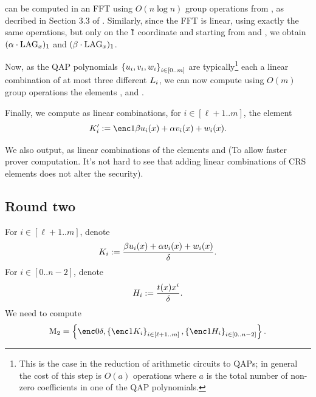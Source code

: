 \documentclass{article}
\begin{document}
 can be computed in an FFT using $O(n \log n)$ group operations from  \powersenc, as decribed in Section 3.3 of \cite{BGG17}.
Similarly, since the FFT is linear, using exactly the same operations, but only on the \G1 coordinate and starting from \powersencalpha and \powersencbeta,
we obtain $(\alpha \cdot \mathrm{LAG}_{x})_1$ and $(\beta\cdot \mathrm{LAG}_{x})_1$.

Now, as the QAP polynomials $\left\{u_i,v_i,w_i\right\}_{i\in [0..m]}$ are typically\footnote{This is the case in the reduction of arithmetic circuits to QAPs; in general the cost of this step is $O(a)$ operations where $a$ is the total number of non-zero coefficients in one of the QAP polynomials.} each a linear combination of at most three different $L_{i}$,
we can now compute using $O(m)$ group operations the elements
\Apolys, \Bpolys and \Cpolys.

Finally, we compute as linear combinations, for $i\in [\ell+1..m]$, the element
\[K'_i \defeq \enc1{\beta u_i(x)+\alpha v_i(x) +w_i(x)}.\]

We also output, as linear combinations of  the elements 
and 
(To allow faster prover computation. It's not hard to see that adding linear combinations of CRS elements does not alter the security).
\subsection{Round two}

For $i\in [\ell+1.. m]$, denote 
\[K_i:= \frac{\beta u_i(x)+\alpha v_i(x) +w_i(x)}{\delta}.\]
For $i\in [0..n-2]$,
denote 
\[H_i := \frac{t(x)x^i}{\delta}.\]
We need to compute
\[\muloflayer{2} = \set{\enc0{\delta},\indexedsetflex{\enc1{K_i}}{\ell+1..m},\indexedset{\enc1{H_i}}{n-2}}.\]
\noindent
\end{document}

